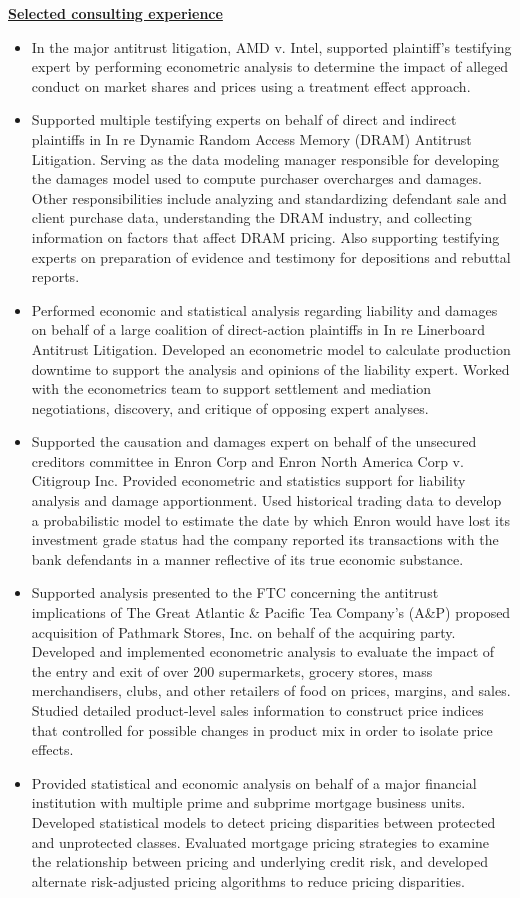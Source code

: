 \documentclass[12pt]{article}
\begin{document}
\underline{\textbf{Selected consulting experience}}
	
	\begin{itemize}
		\item In the major antitrust litigation, AMD v. Intel, supported plaintiff’s testifying expert by performing econometric analysis to determine the impact of alleged conduct on market shares and prices using a treatment effect approach.
\item Supported multiple testifying experts on behalf of direct and indirect plaintiffs in In re Dynamic Random Access Memory (DRAM) Antitrust Litigation. Serving as the data modeling manager responsible for developing the damages model used to compute purchaser overcharges and damages. Other responsibilities include analyzing and standardizing defendant sale and client purchase data, understanding the DRAM industry, and collecting information on factors that affect DRAM pricing. Also supporting testifying experts on preparation of evidence and testimony for depositions and rebuttal reports.
\item Performed economic and statistical analysis regarding liability and damages on behalf of a large coalition of direct-action plaintiffs in In re Linerboard Antitrust Litigation. Developed an econometric model to calculate production downtime to support the analysis and opinions of the liability expert. Worked with the econometrics team to support settlement and mediation negotiations, discovery, and critique of opposing expert analyses.
\item Supported the causation and damages expert on behalf of the unsecured creditors committee in Enron Corp and Enron North America Corp v. Citigroup Inc. Provided econometric and statistics support for liability analysis and damage apportionment. Used historical trading data to develop a probabilistic model to estimate the date by which Enron would have lost its investment grade status had the company reported its transactions with the bank defendants in a manner reflective of its true economic substance. 
\item Supported analysis presented to the FTC concerning the antitrust implications of The Great Atlantic & Pacific Tea Company’s (A&P) proposed acquisition of Pathmark Stores, Inc. on behalf of the acquiring party. Developed and implemented econometric analysis to evaluate the impact of the entry and exit of over 200 supermarkets, grocery stores, mass merchandisers, clubs, and other retailers of food on prices, margins, and sales. Studied detailed product-level sales information to construct price indices that controlled for possible changes in product mix in order to isolate price effects.
\item Provided statistical and economic analysis on behalf of a major financial institution with multiple prime and subprime mortgage business units. Developed statistical models to detect pricing disparities between protected and unprotected classes. Evaluated mortgage pricing strategies to examine the relationship between pricing and underlying credit risk, and developed alternate risk-adjusted pricing algorithms to reduce pricing disparities.


\end{itemize}
\end{document}
